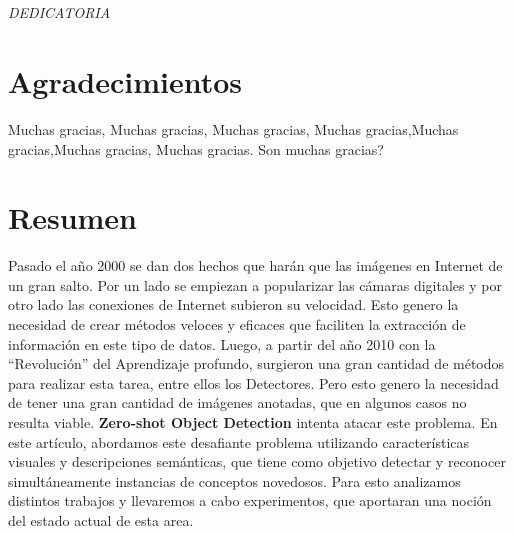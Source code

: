 \documentclass[12pt,twosided]{book}
\begin{document}

\pagestyle{empty}
\frontmatter

\chapter*{}
\begin{flushright}
\textit{DEDICATORIA}
\end{flushright}



\chapter*{Agradecimientos}
Muchas gracias, Muchas gracias, Muchas gracias, Muchas gracias,Muchas gracias,Muchas gracias, Muchas gracias. Son muchas gracias?




\chapter*{Resumen}

\pagestyle{plain}
Pasado el año 2000 se dan dos hechos que harán que las imágenes en Internet de un gran salto. Por un lado se empiezan a popularizar las cámaras digitales y por otro lado las conexiones de Internet subieron su velocidad. Esto genero la necesidad de crear métodos veloces y eficaces que faciliten la extracción de información en este tipo de datos. Luego, a partir del año 2010 con la  ``Revolución'' del Aprendizaje profundo, surgieron una gran cantidad de métodos para realizar esta tarea, entre ellos los Detectores. Pero esto genero la necesidad de tener una gran cantidad de imágenes anotadas, que en algunos casos no resulta viable. \textbf{Zero-shot Object Detection} intenta atacar este problema. En este artículo, abordamos este desafiante problema utilizando características visuales y descripciones semánticas, que tiene como objetivo detectar y reconocer simultáneamente instancias de conceptos novedosos. Para esto analizamos distintos trabajos y llevaremos a cabo experimentos, que aportaran una noción del estado actual de esta area.
\end{document}
